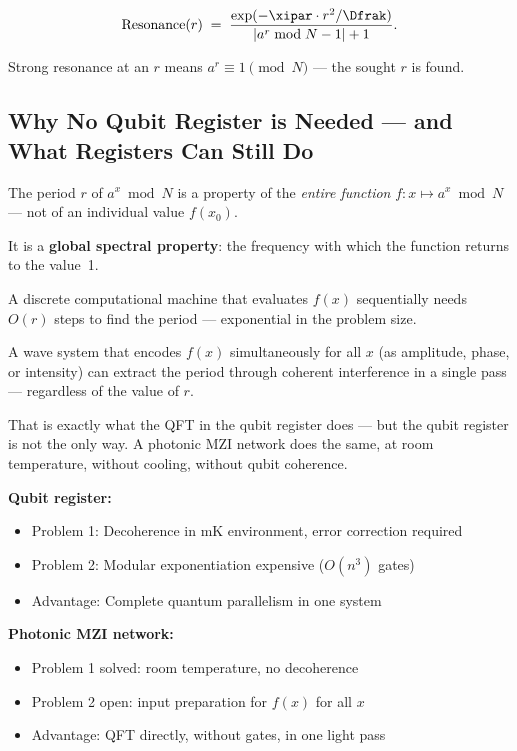 \begin{equation}
  \text{Resonance}(r) \;=\;
  \frac{\exp(-\xipar \cdot r^2 / \Dfrak)}
       {|a^r \bmod N - 1| + 1}.
\end{equation}

Strong resonance at an $r$ means
$a^r \equiv 1 \pmod{N}$ ---
the sought $r$ is found.

\subsection{Why No Qubit Register is Needed ---
  and What Registers Can Still Do}

\begin{foundation}
The period $r$ of $a^x \bmod N$ is a property of the
\emph{entire function} $f : x \mapsto a^x \bmod N$ ---
not of an individual value $f(x_0)$.

It is a \textbf{global spectral property}:
the frequency with which the function returns to the value~1.

A discrete computational machine that evaluates $f(x)$
sequentially needs $O(r)$ steps to find the period ---
exponential in the problem size.

A wave system that encodes $f(x)$ simultaneously
for all $x$ (as amplitude, phase, or intensity)
can extract the period through coherent interference
in a single pass --- regardless of the value of $r$.

That is exactly what the QFT in the qubit register does ---
but the qubit register is not the only way.
A photonic MZI network does the same, at room temperature,
without cooling, without qubit coherence.
\end{foundation}

\begin{important}
\textbf{Qubit register:}
\begin{itemize}
  \item Problem 1: Decoherence in mK environment, error correction required
  \item Problem 2: Modular exponentiation expensive ($O(n^3)$ gates)
  \item Advantage: Complete quantum parallelism in one system
\end{itemize}

\textbf{Photonic MZI network:}
\begin{itemize}
  \item Problem 1 solved: room temperature, no decoherence
  \item Problem 2 open: input preparation for $f(x)$ for all $x$
  \item Advantage: QFT directly, without gates, in one light pass
\end{itemize}
\end{important}

